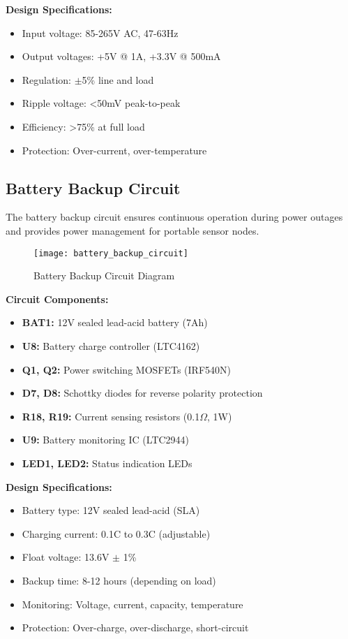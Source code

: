 \textbf{Design Specifications:}
\begin{itemize}
\item Input voltage: 85-265V AC, 47-63Hz
\item Output voltages: +5V @ 1A, +3.3V @ 500mA
\item Regulation: $\pm$5\% line and load
\item Ripple voltage: <50mV peak-to-peak
\item Efficiency: >75\% at full load
\item Protection: Over-current, over-temperature
\end{itemize}

\subsection{Battery Backup Circuit}
\label{subsec:battery_backup_circuit}

The battery backup circuit ensures continuous operation during power outages and provides power management for portable sensor nodes.

\begin{figure}[H]
\centering
\texttt{[image: battery\_backup\_circuit]}
\caption{Battery Backup Circuit Diagram}
\label{fig:battery_backup_circuit}
\end{figure}

\textbf{Circuit Components:}
\begin{itemize}
\item \textbf{BAT1:} 12V sealed lead-acid battery (7Ah)
\item \textbf{U8:} Battery charge controller (LTC4162)
\item \textbf{Q1, Q2:} Power switching MOSFETs (IRF540N)
\item \textbf{D7, D8:} Schottky diodes for reverse polarity protection
\item \textbf{R18, R19:} Current sensing resistors (0.1$\Omega$, 1W)
\item \textbf{U9:} Battery monitoring IC (LTC2944)
\item \textbf{LED1, LED2:} Status indication LEDs
\end{itemize}

\textbf{Design Specifications:}
\begin{itemize}
\item Battery type: 12V sealed lead-acid (SLA)
\item Charging current: 0.1C to 0.3C (adjustable)
\item Float voltage: 13.6V $\pm$ 1\%
\item Backup time: 8-12 hours (depending on load)
\item Monitoring: Voltage, current, capacity, temperature
\item Protection: Over-charge, over-discharge, short-circuit
\end{itemize}

